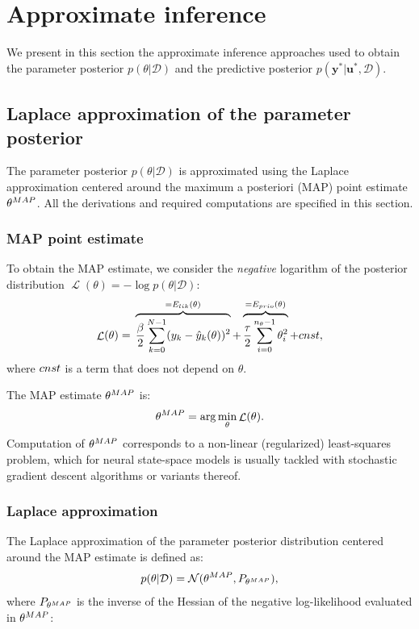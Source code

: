 \documentclass{ifacconf}
\DeclareMathOperator{\nll}{\mathcal{L}}
\newcommand{\nsamp}{N}
\newcommand{\npar}{{n_\theta}}
\newcommand{\N}{\mathcal{N}} %
\newcommand{\MAP}{{\rm MAP}}
\newcommand{\tvec}[1]{{\mathbf{#1}}}
\newcommand{\mean}[1]{\hat{#1}}
\newcommand{\D}{\mathcal{D}} %
\begin{document}
\section{Approximate inference}
We present in this section the approximate inference approaches used to obtain the parameter posterior $p(\theta | \D)$ and 
the predictive posterior $p(\tvec{y}^*| \tvec{u}^*, \D)$.
\subsection{Laplace approximation of the parameter posterior}
The parameter posterior $p(\theta | \D)$ is approximated using the Laplace approximation \cite{bishop2006pattern} centered around the maximum a posteriori (MAP) point estimate  ${\theta^\MAP}$. All the derivations and required computations are specified in this section.
\subsubsection{MAP point estimate}
To obtain the MAP estimate, we consider the \emph{negative} logarithm of the posterior distribution $\nll(\theta) = - \log p(\theta | \D)$:
\begin{equation}
\label{eq:nll}
 \nll(\theta) = {} \overbrace{\frac{\beta}{2} \sum_{k=0}^{\nsamp-1} (y_k - \mean{y}_k(\theta))^2}^{=E_{\rm lik}(\theta)} +
 \overbrace{\frac{\tau}{2} \sum_{i=0}^{\npar-1} \theta_i^2}^{=E_{\rm prio}(\theta)}
 + \rm{cnst},
\end{equation}
where $\rm{cnst}$ is a term that does not depend on $\theta$.

The MAP estimate ${\theta^\MAP}$ is:%
\begin{equation}
  \label{eq:theta_map}
 {\theta^\MAP} = \arg \min_\theta \nll(\theta).
\end{equation}
Computation of $\theta^\MAP$ corresponds to a non-linear (regularized) least-squares problem, which for neural state-space models is usually tackled with
stochastic gradient descent algorithms or variants thereof. 
\subsubsection{Laplace approximation}
The Laplace approximation of the parameter posterior distribution centered around the MAP estimate is defined as:
\begin{equation}
 p(\theta | \D) = \N(\theta^\MAP, P_{\theta^\MAP}),
\end{equation}
where 
$P_{\theta^\MAP}$ is the inverse of the Hessian of 
the {negative }log-likelihood evaluated in $\theta^\MAP$:
\end{document}
